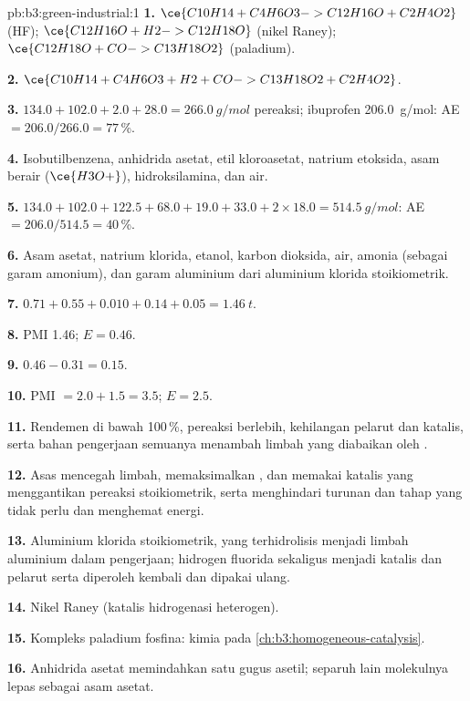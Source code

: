 \begin{solution}{pb:b3:green-industrial:1}
\textbf{1.} $\ce{C10H14 + C4H6O3 -> C12H16O + C2H4O2}$ (HF); $\ce{C12H16O + H2 -> C12H18O}$ (nikel Raney);
$\ce{C12H18O + CO -> C13H18O2}$ (paladium).

\textbf{2.} $\ce{C10H14 + C4H6O3 + H2 + CO -> C13H18O2 + C2H4O2}$.

\textbf{3.} $134.0 + 102.0 + 2.0 + 28.0 = \qty{266.0}{g/mol}$ pereaksi; ibuprofen \qty{206.0}{g/mol}: AE $= 206.0/266.0 = 77$\,\%.

\textbf{4.} Isobutilbenzena, anhidrida asetat, etil kloroasetat, natrium etoksida,
asam berair ($\ce{H3O+}$), hidroksilamina, dan air.

\textbf{5.} $134.0 + 102.0 + 122.5 + 68.0 + 19.0 + 33.0 + 2 \times 18.0 = \qty{514.5}{g/mol}$: AE $= 206.0/514.5 = 40$\,\%.

\textbf{6.} Asam asetat, natrium klorida, etanol, karbon dioksida, air, amonia (sebagai
garam amonium), dan garam aluminium dari aluminium klorida stoikiometrik.

\textbf{7.} $0.71 + 0.55 + 0.010 + 0.14 + 0.05 = \qty{1.46}{t}$.

\textbf{8.} PMI 1.46; $E = 0.46$.

\textbf{9.} $0.46 - 0.31 = 0.15$.

\textbf{10.} PMI $= 2.0 + 1.5 = 3.5$; $E = 2.5$.

\textbf{11.} Rendemen di bawah 100\,\%, pereaksi berlebih, kehilangan pelarut dan katalis, serta
bahan pengerjaan semuanya menambah limbah yang diabaikan oleh .

\textbf{12.} Asas mencegah limbah, memaksimalkan , dan memakai katalis
yang menggantikan pereaksi stoikiometrik, serta menghindari turunan dan tahap yang tidak perlu dan menghemat energi.

\textbf{13.} Aluminium klorida stoikiometrik, yang terhidrolisis menjadi limbah aluminium dalam
pengerjaan; hidrogen fluorida sekaligus menjadi katalis dan pelarut serta diperoleh kembali dan dipakai ulang.

\textbf{14.} Nikel Raney (katalis hidrogenasi heterogen).

\textbf{15.} Kompleks paladium fosfina: kimia  pada
\cref{ch:b3:homogeneous-catalysis}.

\textbf{16.} Anhidrida asetat memindahkan satu gugus asetil; separuh lain
molekulnya lepas sebagai asam asetat.


\end{solution}
